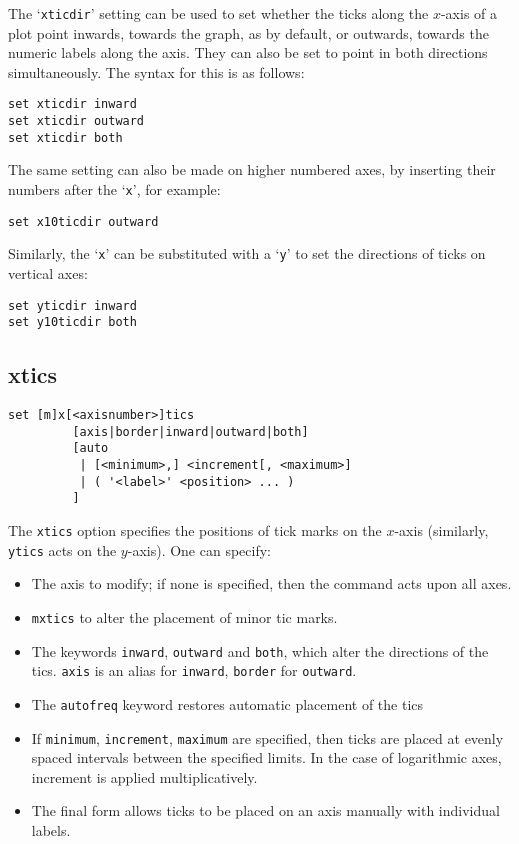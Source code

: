 The `{\tt xticdir}' setting can be used to set whether the ticks along the
$x$-axis of a plot point inwards, towards the graph, as by default, or outwards,
towards the numeric labels along the axis. They can also be set to point in both
directions simultaneously. The syntax for this is as follows:

\begin{verbatim}
set xticdir inward 
set xticdir outward 
set xticdir both
\end{verbatim}

The same setting can also be made on higher numbered axes, by inserting their
numbers after the `{\tt x}', for example:

\begin{verbatim}
set x10ticdir outward
\end{verbatim}

Similarly, the `{\tt x}' can be substituted with a `{\tt y}' to set the directions of ticks
on vertical axes:

\begin{verbatim}
set yticdir inward
set y10ticdir both
\end{verbatim}

\subsection{xtics}

\begin{verbatim}
set [m]x[<axisnumber>]tics 
         [axis|border|inward|outward|both] 
         [auto 
          | [<minimum>,] <increment[, <maximum>] 
          | ( '<label>' <position> ... ) 
         ] 
\end{verbatim}

The {\tt xtics} option specifies the positions of tick marks on the $x$-axis
(similarly, {\tt ytics} acts on the $y$-axis).  One can specify:

\begin{itemize}
\item The axis to modify; if none is specified, then the command acts upon all axes.

\item {\tt mxtics} to alter the placement of minor tic marks.

\item The keywords {\tt inward}, {\tt outward} and {\tt both}, which alter the
directions of the tics.  {\tt axis} is an alias for {\tt inward}, {\tt border}
for {\tt outward}.

\item The {\tt autofreq} keyword restores automatic placement of the tics

\item If {\tt minimum}, {\tt increment}, {\tt maximum} are specified, then ticks
are placed at evenly spaced intervals between the specified limits. In the case
of logarithmic axes, increment is applied multiplicatively. 

\item The final form allows ticks to be placed on an axis manually with
individual labels.
\end{itemize}
   
